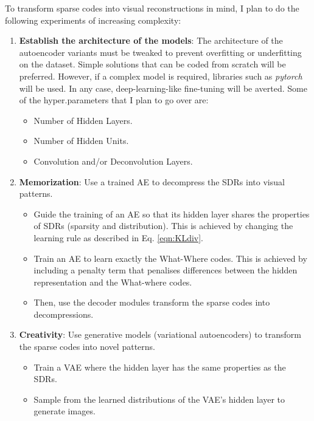 \documentclass[runningheads]{llncs}
\begin{document}
To transform sparse codes into visual reconstructions in mind, I plan to do the following experiments of increasing complexity:
\begin{enumerate}

    \item \textbf{Establish the architecture of the models}: The architecture of the autoencoder variants must be tweaked to prevent overfitting or underfitting on the dataset. Simple solutions that can be coded from scratch will be preferred. However, if a complex model is required, libraries such as \textit{pytorch} will be used. In any case, deep-learning-like fine-tuning will be averted.
    Some of the hyper.parameters that I plan to go over are:
    \begin{itemize}
        \item Number of Hidden Layers.
        \item Number of Hidden Units.
        \item Convolution and/or Deconvolution Layers.
    \end{itemize}
    
    \item \textbf{Memorization}: Use a trained AE to decompress the SDRs into visual patterns.
    
    \begin{itemize}
        \item Guide the training of an AE so that its hidden layer shares the properties of SDRs (sparsity and distribution). This is achieved by changing the learning rule as described in Eq. \ref{eqn:KLdiv}.
        \item Train an AE to learn exactly the What-Where codes. This is achieved by including a penalty term that penalises differences between the hidden representation and the What-where codes.
        \item Then, use the decoder modules transform the sparse codes into decompressions.
    \end{itemize}
    \item \textbf{Creativity}: Use generative models (variational autoencoders) to transform the sparse codes into novel patterns.
    \begin{itemize}
        \item Train a VAE where the hidden layer has the same properties as the SDRs.
        \item Sample from the learned distributions of the  VAE's hidden layer to generate images.
    \end{itemize}


\end{enumerate}
\end{document}
